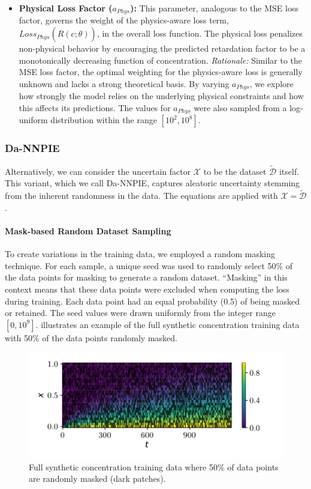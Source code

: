 \begin{itemize}
    \item \textbf{Physical Loss Factor ($a_{Phys}$):} This parameter, analogous to the MSE loss factor, governs the weight of the physics-aware loss term, $Loss_{Phys}(\hat{R}(c;\theta))$, in the overall loss function. The physical loss penalizes non-physical behavior by encouraging the predicted retardation factor to be a monotonically decreasing function of concentration. \textit{Rationale:} Similar to the MSE loss factor, the optimal weighting for the physics-aware loss is generally unknown and lacks a strong theoretical basis. By varying $a_{Phys}$, we explore how strongly the model relies on the underlying physical constraints and how this affects its predictions. The values for $a_{Phys}$ were also sampled from a log-uniform distribution within the range $[10^2, 10^8]$.
\end{itemize}



\subsubsection{Da-NNPIE}

Alternatively, we can consider the uncertain factor $\mathcal{X}$ to be the dataset $\tilde{\mathcal{D}}$ itself. This variant, which we call Da-NNPIE, captures aleatoric uncertainty stemming from the inherent randomness in the data. The equations are applied with $\mathcal{X} = \tilde{\mathcal{D}}$.


\paragraph{Mask-based Random Dataset Sampling}

To create variations in the training data, we employed a random masking technique. For each sample, a unique seed was used to randomly select 50\% of the data points for masking to generate a random dataset. ``Masking'' in this context means that these data points were excluded when computing the loss during training. Each data point had an equal probability (0.5) of being masked or retained. The seed values were drawn uniformly from the integer range $[0, 10^9]$.  illustrates an example of the full synthetic concentration training data with 50\% of the data points randomly masked.

\begin{figure}[h!]
    \centering
    \includegraphics{figs/c_diss_field_train_random_subset.pdf}
    \caption{Full synthetic concentration training data where 50\% of data points are randomly masked (dark patches).}
    \label{fig:training_data_mask}
\end{figure}


